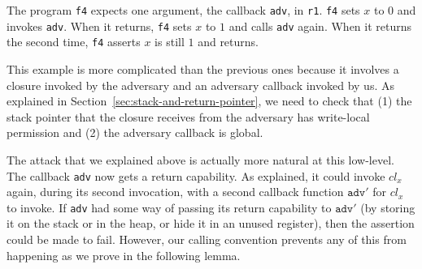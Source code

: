 \documentclass[format=acmsmall, review=true, screen=true]{acmart}
\renewcommand{\sectionname}{Section}
\begin{document}
The program \texttt{f4} expects one argument, the callback \texttt{adv}, in \texttt{r1}.
\texttt{f4} sets $x$ to $0$ and invokes \texttt{adv}.
When it returns, \texttt{f4} sets $x$ to $1$ and calls \texttt{adv} again.
When it returns the second time, \texttt{f4} asserts $x$ is still $1$ and returns.

This example is more complicated than the previous ones because it involves a closure invoked by the adversary and an adversary callback invoked by us.
As explained in \sectionname~\ref{sec:stack-and-return-pointer}, we need to check that (1) the stack pointer that the closure receives from the adversary has write-local permission and (2) the adversary callback is global.

The attack that we explained above is actually more natural at this low-level.
The callback \texttt{adv} now gets a return capability.
As explained, it could invoke $\mathit{cl}_x$ again, during its second invocation, with a second callback function $\texttt{adv}'$ for $\mathit{cl}_x$ to invoke.
If \texttt{adv} had some way of passing its return capability to $\texttt{adv}'$ (by storing it on the stack or in the heap, or hide it in an unused register), then the assertion could be made to fail.
However, our calling convention prevents any of this from happening as we prove in the following lemma.
\end{document}
